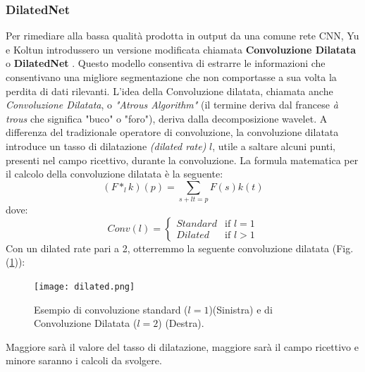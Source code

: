 \subsubsection{DilatedNet}
Per rimediare alla bassa qualità prodotta in output da una comune rete 
CNN, Yu e Koltun introdussero un versione modificata chiamata {\bfseries{Convoluzione 
Dilatata}} o {\bfseries{DilatedNet}} \cite{DilatedNet}. Questo modello consentiva di 
estrarre le informazioni che consentivano una migliore segmentazione che 
non comportasse a sua volta la perdita di dati rilevanti. L'idea della 
Convoluzione dilatata, chiamata anche \emph{Convoluzione Dilatata}, o \emph{"Atrous 
Algorithm"} (il termine deriva dal francese \emph{à trous} che significa "buco" o 
"foro"),  deriva dalla decomposizione wavelet. A differenza del tradizionale 
operatore di convoluzione, la convoluzione dilatata introduce un tasso di 
dilatazione \emph{(dilated rate)} $l$, utile a saltare alcuni punti, presenti nel campo 
ricettivo, durante la convoluzione. La formula matematica per il calcolo 
della convoluzione dilatata è la seguente:
\begin{equation}
    (F*_lk)(p) = \sum_{s+lt=p}F(s)k(t)
\end{equation}
dove:
\begin{equation}\label{dilated rate}
    Conv(l) = \left\{
        \begin{array}{rl}
        Standard & \mbox{if } l = 1\\
        Dilated & \mbox{if } l > 1
        \end{array}
        \right.
\end{equation}
Con un dilated rate pari a 2, otterremmo la seguente convoluzione dilatata 
(Fig. (\ref{dilated})):
\begin{figure}
    \centering
    \texttt{[image: dilated.png]}
    \centering
    \caption{Esempio di convoluzione standard ($l=1$)(Sinistra) e di Convoluzione Dilatata ($l=2$) (Destra).}
    \label{dilated}
\end{figure}
Maggiore sarà il valore del tasso di dilatazione, maggiore sarà 
il campo ricettivo e minore saranno i calcoli da svolgere. 

